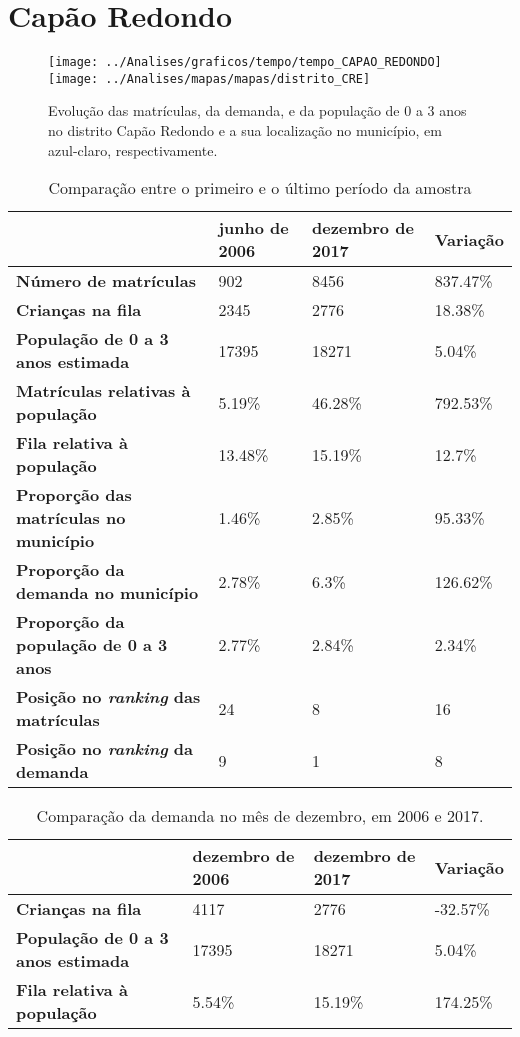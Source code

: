 \section{Capão Redondo}
\begin{figure}[H]
\centering
\texttt{[image: ../Analises/graficos/tempo/tempo\_CAPAO\_REDONDO]}
\texttt{[image: ../Analises/mapas/mapas/distrito\_CRE]}
\caption{Evolução das matrículas, da demanda, e da população de 0 a 3 anos no distrito Capão Redondo e a sua localização no município, em azul-claro, respectivamente.}
\end{figure}
\begin{table}[H]
\begin{tabular}{l|l|l|l}
\textbf{}                                      & \textbf{junho de 2006}       & \textbf{dezembro de 2017}    & \textbf{Variação} \\ \hline
\textbf{Número de matrículas}                  & 902 & 8456 & 837.47\% \\ \hline
\textbf{Crianças na fila}                      & 2345 & 2776 & 18.38\% \\ \hline
\textbf{População de 0 a 3 anos estimada}      & 17395 & 18271 & 5.04\% \\ \hline
\textbf{Matrículas relativas à população}      & 5.19\% & 46.28\% & 792.53\% \\ \hline
\textbf{Fila relativa à população}             & 13.48\% & 15.19\% & 12.7\% \\ \hline
\textbf{Proporção das matrículas no município} & 1.46\% & 2.85\% & 95.33\% \\ \hline
\textbf{Proporção da demanda no município}     & 2.78\% & 6.3\% & 126.62\% \\ \hline
\textbf{Proporção da população de 0 a 3 anos}  & 2.77\% & 2.84\% & 2.34\% \\ \hline
\textbf{Posição no \textit{ranking} das matrículas}     & 24 & 8 & 16 \\ \hline
\textbf{Posição no \textit{ranking} da demanda}         & 9 & 1 & 8 \\ 
\end{tabular}
\caption{Comparação entre o primeiro e o último período da amostra}
\end{table}
\begin{table}[H]
\begin{tabular}{l|l|l|l}
\textbf{}                                 & \textbf{dezembro de 2006} & \textbf{dezembro de 2017} & \textbf{Variação} \\ \hline
\textbf{Crianças na fila}                      & 4117 & 2776 & -32.57\% \\ \hline
\textbf{População de 0 a 3 anos estimada}      & 17395 & 18271 & 5.04\% \\ \hline
\textbf{Fila relativa à população}             & 5.54\% & 15.19\% & 174.25\% \\
\end{tabular}
\caption{Comparação da demanda no mês de dezembro, em 2006 e 2017.}
\end{table}
